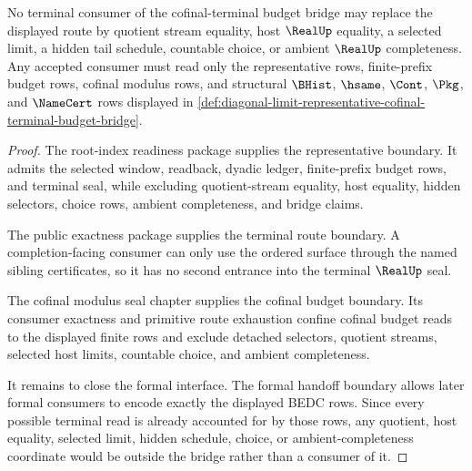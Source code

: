 \begin{theorem}
\label{thm:diagonal-limit-representative-terminal-consumer-cofinal-nonescape}
No terminal consumer of the cofinal-terminal budget bridge may replace the displayed route by quotient stream equality, host $\RealUp$ equality, a selected limit, a hidden tail schedule, countable choice, or ambient $\RealUp$ completeness. Any accepted consumer must read only the representative rows, finite-prefix budget rows, cofinal modulus rows, and structural $\BHist$, $\hsame$, $\Cont$, $\Pkg$, and $\NameCert$ rows displayed in \autoref{def:diagonal-limit-representative-cofinal-terminal-budget-bridge}.
\end{theorem}
\begin{proof}
The root-index readiness package supplies the representative boundary. It admits the selected window, readback, dyadic ledger, finite-prefix budget rows, and terminal seal, while excluding quotient-stream equality, host equality, hidden selectors, choice rows, ambient completeness, and bridge claims.

The public exactness package supplies the terminal route boundary. A completion-facing consumer can only use the ordered surface through the named sibling certificates, so it has no second entrance into the terminal $\RealUp$ seal.

The cofinal modulus seal chapter supplies the cofinal budget boundary. Its consumer exactness and primitive route exhaustion confine cofinal budget reads to the displayed finite rows and exclude detached selectors, quotient streams, selected host limits, countable choice, and ambient completeness.

It remains to close the formal interface. The formal handoff boundary allows later formal consumers to encode exactly the displayed BEDC rows. Since every possible terminal read is already accounted for by those rows, any quotient, host equality, selected limit, hidden schedule, choice, or ambient-completeness coordinate would be outside the bridge rather than a consumer of it.
\end{proof}


